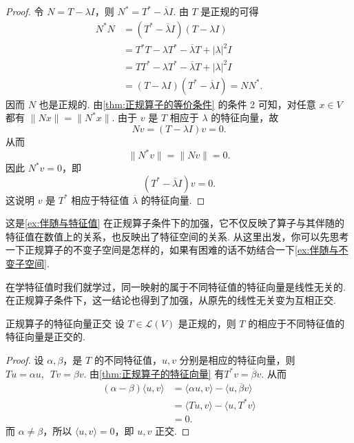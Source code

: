 \begin{proof}
    令 $ N = T - \lambda I $，则 $N^* = T^* - \overline{\lambda} I$. 由 $ T $ 是正规的可得
    \begin{align*}
        N^* N &= (T^* - \overline{\lambda} I)(T - \lambda I) \\
        &= T^* T - \lambda T^* - \overline{\lambda} T + |\lambda|^2 I \\
        &= T T^* - \lambda T^* - \overline{\lambda} T + |\lambda|^2 I \\
        &= (T - \lambda I)(T^* - \overline{\lambda} I) = N N^*.
    \end{align*}
    因而 $ N $ 也是正规的. 由\autoref{thm:正规算子的等价条件} 的条件 2 可知，对任意 $ x \in V $ 都有 $ \| N x \| = \| N^* x \| $. 由于 $ v $ 是 $ T $ 相应于 $ \lambda $ 的特征向量，故
    \[
        N v = (T - \lambda I)v = 0.
    \]
    从而
    \[
        \| N^* v \| = \| N v \| = 0.
    \]
    因此 $ N^* v = 0 $，即
    \[
        (T^* - \overline{\lambda} I)v = 0.
    \]
    这说明 $ v $ 是 $ T^* $ 相应于特征值 $ \overline{\lambda} $ 的特征向量.
\end{proof}

这是\autoref{ex:伴随与特征值} 在正规算子条件下的加强，它不仅反映了算子与其伴随的特征值在数值上的关系，也反映出了特征空间的关系. 从这里出发，你可以先思考一下正规算子的不变子空间是怎样的，如果有困难的话不妨结合一下\autoref{ex:伴随与不变子空间}.

在学特征值时我们就学过，同一映射的属于不同特征值的特征向量是线性无关的. 在正规算子条件下，这一结论也得到了加强，从原先的线性无关变为互相正交.

\begin{theorem}{}{正规算子的特征向量正交}
    设 $ T \in \mathcal{L}(V) $ 是正规的，则 $ T $ 的相应于不同特征值的特征向量是正交的.
\end{theorem}

\begin{proof}
    设 $ \alpha, \beta $，是 $ T $ 的不同特征值，$ u, v $ 分别是相应的特征向量，则 $ Tu = \alpha u,\enspace Tv = \beta v $. 由\autoref{thm:正规算子的特征向量} 有$ T^*v = \overline{\beta} v $. 从而
    \begin{align*}
        (\alpha - \beta)\langle u, v \rangle
         & = \langle \alpha u, v \rangle - \langle u, \overline{\beta}v \rangle \\
         & = \langle Tu, v \rangle - \langle u, T^*v \rangle                    \\
         & = 0.
    \end{align*}
    而 $ \alpha \neq \beta $，所以 $ \langle u, v \rangle = 0 $，即 $ u, v $ 正交.
\end{proof}

